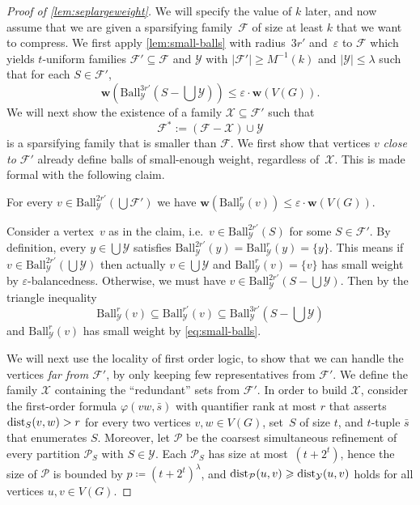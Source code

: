 \documentclass[a4paper,UKenglish,cleveref, autoref, thm-restate]{lipics-v2021}
\newcommand{\eps}{\varepsilon}
\newcommand{\XX}{\mathcal{X}}
\newcommand{\YY}{\mathcal{Y}}
\newcommand{\dist}{\textnormal{dist}}
\renewcommand{\phi}{\varphi}
\newcommand{\weight}{\mathbf{w}}
\newcommand{\FF}{\mathcal{F}}
\newcommand{\PP}{\mathcal{P}}
\renewcommand{\le}{\leqslant}
\renewcommand{\leq}{\le}
\renewcommand{\ge}{\geqslant}
\renewcommand{\geq}{\ge}
\newcommand{\Ball}{\mathrm{Ball}}
\begin{document}
\begin{proof}[Proof of \cref{lem:seplargeweight}]
We will specify the value of $k$ later, and now assume that we are given a sparsifying family~$\FF$ of size at least $k$ that we want to compress.
We first apply \cref{lem:small-balls} with radius~$3r'$ and~$\eps$ to $\FF$ which yields $t$-uniform families $\FF' \subseteq \FF$ and $\YY$ with $|\FF'| \geq M^{-1}(k)$ and $|\YY| \leq \lambda$ such that for each $S \in \FF'$,
\begin{equation*}\label{eq:small-balls}
    \weight(\Ball^{3r'}_\YY(S- \textstyle{\bigcup \YY} )) \leq \eps \cdot \weight (V(G)).\tag{$*$}
\end{equation*}
We will next show the existence of a family $\XX \subseteq \FF'$ such that
\[
    \FF^* := (\FF - \XX) \cup \YY
\]
is a sparsifying family that is smaller than $\FF$.
We first show that vertices $v$ \emph{close to $\FF'$} already define balls of small-enough weight, regardless of~$\XX$.
This is made formal with the following claim.
\begin{claim}\label{clm:balls-close-to-S}
    For every $v \in \Ball_\YY^{2r'}(\bigcup \FF')$ we have $\weight(\Ball_\YY^{r}(v)) \leq \eps \cdot \weight (V(G))$.
\end{claim}
\begin{claimproof}
    Consider a vertex~$v$ as in the claim, i.e.\ $v \in \Ball_\YY^{2r'}(S)$ for some $S \in \FF'$.
    By definition, every $y \in \bigcup\YY$ satisfies $\Ball^{2r'}_\YY(y) = \Ball^{r}_\YY(y) = \{y\}$.
    This means if $v \in \Ball^{2r'}_\YY(\bigcup \YY)$ then actually $v \in \bigcup\YY$ and $\Ball^r_\YY (v) = \{ v \}$ has small weight by $\eps$-balancedness. 
    Otherwise, we must have $v \in \Ball^{2r'}_\YY(S - \bigcup \YY)$.
    Then by the triangle inequality
    \[
        \Ball^{r}_\YY(v) \subseteq \Ball^{r'}_\YY(v) \subseteq \Ball^{3r'}_\YY(S- \textstyle{\bigcup \YY})
    \]
    and $\Ball_\YY^{r}(v)$ has small weight by \eqref{eq:small-balls}.
\end{claimproof}
We will next use the locality of first order logic, to show that we can handle the vertices \emph{far from $\FF'$}, by only keeping few representatives from $\FF'$.
We define the family $\XX$ containing the ``redundant'' sets from $\FF'$.
In order to build $\XX$,
consider the first-order formula  $\phi(vw, \bar s)$ with quantifier rank at most $r$ that asserts $\dist_S(v,w) > r$ for every two vertices $v,w \in V(G)$, set~$S$ of size $t$, and $t$-tuple $\bar s$ that enumerates $S$.
Moreover, let $\PP$ be the coarsest simultaneous refinement of every partition $\PP_S$ with $S \in \YY$.
Each $\PP_S$ has size at most~$(t+2^t)$, hence the size of $\PP$ is bounded by $p \coloneqq (t+2^t)^\lambda$,
and $\dist_\PP(u,v) \geq \dist_\YY(u,v)$ holds for all vertices $u,v \in V(G)$.


\end{proof}
\end{document}
